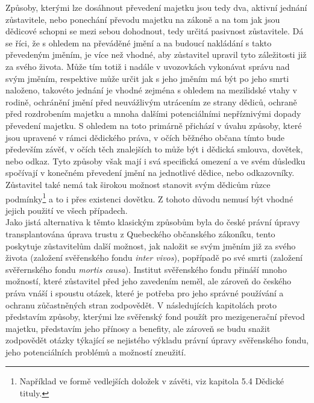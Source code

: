 \documentclass{article}
\begin{document}
Způsoby, kterými lze dosáhnout převedení majetku jsou tedy dva, aktivní jednání zůstavitele, nebo ponechání převodu majetku na zákoně a na tom jak jsou dědicové schopni se mezi sebou dohodnout, tedy určitá pasivnost zůstavitele. Dá se říci, že s ohledem na převáděné jmění a na budoucí nakládání s takto převedeným jměním, je více než vhodné, aby zůstavitel upravil tyto záležitosti již za svého života. Může tím totiž i nadále v uvozovkách vykonávat správu nad svým jměním, respektive může určit jak s jeho jměním má být po jeho smrti naloženo, takovéto jednání je vhodné zejména s ohledem na mezilidské vtahy v rodině, ochránění jmění před neuvážlivým utrácením ze strany dědiců, ochraně před rozdrobením majetku a mnoha dalšími potenciálními nepříznivými dopady převedení majetku. S ohledem na toto primárně přichází v úvahu způsoby, které jsou upravené v rámci dědického práva, v očích běžného občana tímto bude především závěť, v očích těch znalejších to může být i dědická smlouva, dovětek, nebo odkaz. Tyto způsoby však mají i svá specifická omezení a ve svém důsledku spočívají v konečném převedení jmění na jednotlivé dědice, nebo odkazovníky. Zůstavitel také nemá tak širokou možnost stanovit svým dědicům růzce podmínky\footnote{Například ve formě vedlejších doložek v závěti, viz kapitola 5.4 Dědické tituly.} a to i přes existenci dovětku. Z tohoto důvodu nemusí být vhodné jejich použití ve všech případech. \\



Jako jistá alternativa k těmto klasickým způsobům byla do české právní úpravy transplantována úprava trustu z Quebeckého občanského zákoníku, tento poskytuje zůstavitelům další možnost, jak naložit se svým jměním již za svého života (založení svěřenského fondu \textit{inter vivos}), popřípadě po své smrti (založení svěřernského fondu \textit{mortis causa}). Institut svěřenského fondu přináší mnoho možností, které zůstavitel před jeho zavedením neměl, ale zároveň do českého práva vnáší i spoustu otázek, které je potřeba pro jeho správné používání a ochranu zůčastněných stran zodpovědět. V následujících kapitolách proto představím způsoby, kterými lze svěřenský fond použít pro mezigenerační převod majetku, představím jeho přínosy a benefity, ale zároveň se budu snažit zodpovědět otázky týkající se nejistého výkladu právní úpravy svěřenského fondu, jeho potenciálních problémů a možností zneužití. \\
\end{document}
